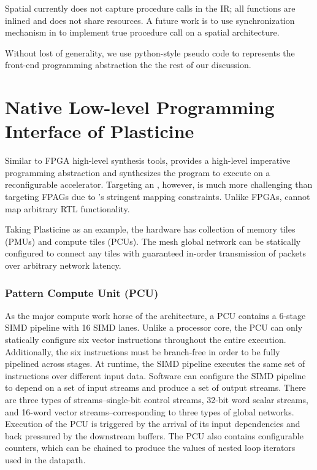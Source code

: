 Spatial currently does not capture procedure calls in the IR; all functions are inlined and does not
share resources. A future work is to use synchronization mechanism in \name to implement true procedure
call on a spatial architecture.

Without lost of generality, we use python-style pseudo code to represents the front-end programming
abstraction the the rest of our discussion.

\section{Native Low-level Programming Interface of Plasticine}
Similar to FPGA high-level synthesis tools, \name provides a high-level imperative programming
abstraction and synthesizes the program to execute on a reconfigurable accelerator. Targeting an \rda, however,
is much more challenging than targeting FPAGs due to \rda's stringent mapping constraints. 
Unlike FPGAs, \rdas cannot map arbitrary RTL functionality. 

Taking Plasticine as an example, 
the hardware has collection of memory tiles (PMUs) and compute tiles (PCUs). 
The mesh global network can be statically configured to connect any tiles with guaranteed in-order 
transmission of packets over arbitrary network latency.

\subsubsection{Pattern Compute Unit (PCU)}
As the major compute work horse of the architecture, a PCU contains a 6-stage SIMD pipeline with 16 SIMD lanes. 
Unlike a processor core, the PCU can only statically configure six vector instructions throughout the
entire execution.
Additionally, the six instructions must be branch-free in order to be fully pipelined across stages.
At runtime, the SIMD pipeline executes the same set of instructions over different input data.
Software can configure the SIMD pipeline to depend on a set of input streams and
produce a set of output streams. 
There are three types of streams--single-bit control streams, 32-bit word scalar streams, and
16-word vector streams--corresponding to three types of global networks.
Execution of the PCU is triggered by the arrival of its input dependencies and back pressured by
the downstream buffers.
The PCU also contains configurable counters, which can be chained to produce the values of nested
loop iterators used in the datapath. 


